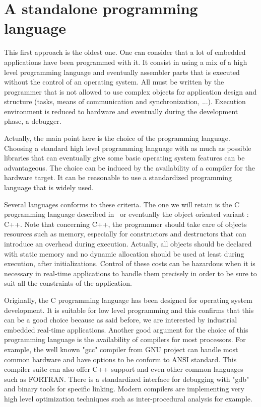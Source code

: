 \documentclass[10pt]{report}
\begin{document}
\section{A standalone programming language}

This first approach is the oldest one. One can consider that a lot of embedded applications have been programmed with it.
It consist in using a mix of a high level programming language and eventually assembler parts that is executed without
the control of an operating system. All must be written by the programmer that is not allowed to use complex objects
for application design and structure (tasks, means of communication and synchronization, ...). Execution environment
is reduced to hardware and eventually during the development phase, a debugger.

Actually, the main point here is the choice of the programming language. Choosing a standard high level programming
language with as much as possible libraries that can eventually give some basic operating system features can be
advantageous. The choice can be induced by the availability of a compiler for the hardware target. It can be reasonable
to use a standardized programming language that is widely used.

Several languages conforms to these criteria. The one we will retain is the C programming language described in~\cite{KR:88}
or eventually the object oriented variant : C++. Note that concerning C++, the programmer should take care of objects
resources such as memory, especially for constructors and destructors that can introduce an overhead during execution.
Actually, all objects should be declared with static memory and no dynamic allocation should be used at least during
execution, after initializations. Control of these costs can be hazardous when it is necessary in real-time applications
to handle them precisely in order to be sure to suit all the constraints of the application.

Originally, the C programming language has been designed for operating system development. It is suitable for low level
programming and this confirms that this can be a good choice because as said before, we are interested by industrial
embedded real-time applications. Another good argument for the choice of this programming language is the availability
of compilers for most processors. For example, the well known "gcc" compiler from GNU project can handle most common
hardware and have options to be conform to ANSI standard. This compiler suite can also offer C++ support and even
other common languages such as FORTRAN. There is a standardized interface for debugging with "gdb" and binary tools
for specific linking. Modern compilers are implementing very high level optimization techniques such as inter-procedural
analysis for example.
\end{document}
